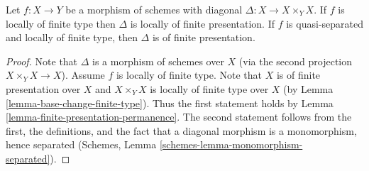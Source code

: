 \begin{lemma}
\label{lemma-diagonal-morphism-finite-type}
Let $f : X \to Y$ be a morphism of schemes with diagonal
$\Delta : X \to X \times_Y X$. If $f$ is locally of finite type
then $\Delta$ is locally of finite presentation. If $f$ is quasi-separated
and locally of finite type, then $\Delta$ is of finite presentation.
\end{lemma}

\begin{proof}
Note that $\Delta$ is a morphism of schemes over $X$ (via the second
projection $X \times_Y X \to X$). Assume $f$ is locally of finite type.
Note that $X$ is of finite presentation over $X$ and $X \times_Y X$ is
locally of finite type over $X$ (by Lemma \ref{lemma-base-change-finite-type}).
Thus the first statement holds by
Lemma \ref{lemma-finite-presentation-permanence}.
The second statement follows from the first, the definitions, and
the fact that a diagonal morphism is a monomorphism, hence separated
(Schemes, Lemma \ref{schemes-lemma-monomorphism-separated}).
\end{proof}








